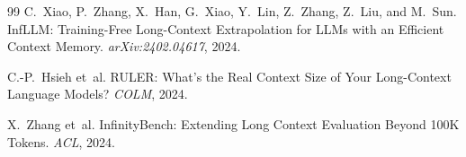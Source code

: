 \documentclass[11pt,a4paper]{article}
\begin{document}
\begin{thebibliography}{99}
C.~Xiao, P.~Zhang, X.~Han, G.~Xiao, Y.~Lin, Z.~Zhang, Z.~Liu, and M.~Sun.
\newblock InfLLM: Training-Free Long-Context Extrapolation for LLMs with an Efficient Context Memory.
\newblock \emph{arXiv:2402.04617}, 2024.

C.-P.~Hsieh et~al.
\newblock RULER: What's the Real Context Size of Your Long-Context Language Models?
\newblock \emph{COLM}, 2024.

X.~Zhang et~al.
\newblock InfinityBench: Extending Long Context Evaluation Beyond 100K Tokens.
\newblock \emph{ACL}, 2024.

\end{thebibliography}
\end{document}
